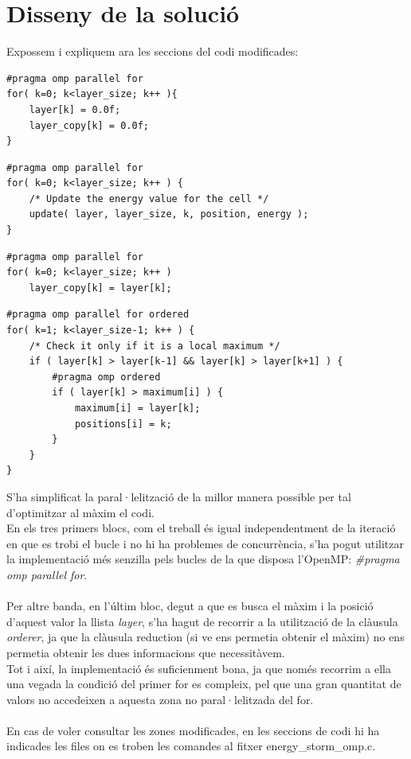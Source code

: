 \documentclass[a4paper, 11pt]{article}
\begin{document}
\section{Disseny de la solució}
Expossem i expliquem ara les seccions del codi modificades:
\begin{lstlisting}[language = GERONA, firstnumber = 178]
#pragma omp parallel for 
for( k=0; k<layer_size; k++ ){
    layer[k] = 0.0f;
    layer_copy[k] = 0.0f;
}
\end{lstlisting}
\begin{lstlisting}[language = GERONA, firstnumber = 200]
#pragma omp parallel for 
for( k=0; k<layer_size; k++ ) {
    /* Update the energy value for the cell */
    update( layer, layer_size, k, position, energy );
}
\end{lstlisting}
\begin{lstlisting}[language = GERONA, firstnumber = 209]
#pragma omp parallel for 
for( k=0; k<layer_size; k++ )
    layer_copy[k] = layer[k];
\end{lstlisting}
\begin{lstlisting}[language = GERONA, firstnumber = 228]
#pragma omp parallel for ordered
for( k=1; k<layer_size-1; k++ ) {
    /* Check it only if it is a local maximum */
    if ( layer[k] > layer[k-1] && layer[k] > layer[k+1] ) {
        #pragma omp ordered
        if ( layer[k] > maximum[i] ) {
            maximum[i] = layer[k];
            positions[i] = k;
        }
    }
}
\end{lstlisting}
S'ha simplificat la paral·lelització de la millor manera possible per tal d'optimitzar al màxim el codi.\\
En els tres primers blocs, com el treball és igual independentment de la iteració en que es trobi el bucle i no hi ha problemes de concurrència, s'ha pogut utilitzar la implementació més senzilla pels bucles de la que disposa l'OpenMP: \textit{\#pragma omp parallel for}.\\\\
Per altre banda, en l'últim bloc, degut a que es busca el màxim i la posició d'aquest valor la llista \textit{layer}, s'ha hagut de recorrir a la utilització de la clàusula \textit{orderer}, ja que la clàusula reduction (si ve ens permetia obtenir el màxim) no ens permetia obtenir les dues informacions que necessitàvem.\\
Tot i així, la implementació és suficienment bona, ja que només recorrim a ella una vegada la condició del primer for es compleix, pel que una gran quantitat de valors no accedeixen a aquesta zona no paral·lelitzada del for.\\\\
En cas de voler consultar les zones modificades, en les seccions de codi hi ha indicades les files on es troben les comandes al fitxer \textcolor{darkpastelgreen}{energy\_storm\_omp.c}.
\end{document}
